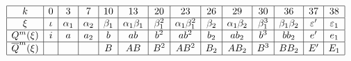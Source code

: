 \documentclass{article}
\begin{document}
\(
\begin{array}{|c|*{13}{c|}}
  \hline
  k & 0 & 3 & 7 & 10 & 13 & 20 & 23 & 26 & 29 & 30 & 36 & 37 & 38 \\ \hline
  \xi & \iota & \alpha_1 & \alpha_2 & \beta_1 & \alpha_1\beta_1 & \beta_1^2 & \alpha_1\beta_1^2 & \beta_2 & \alpha_1\beta_2 & \beta_1^3 & \beta_1\beta_2 & \varepsilon' & \varepsilon_1 \\ \hline
  Q^m(\xi) & i & a & a_2 & b & ab & b^2 & ab^2 & b_2 & ab_2 & b^3 & bb_2 & e' & e_1 \\ \hline
  \overline{Q}^m(\xi) & & & & B & AB & B^2 & AB^2 & B_2 & AB_2 & B^3 & BB_2 & E' & E_1 \\ \hline
\end{array}
\)
\end{document}

